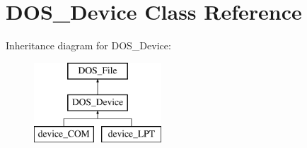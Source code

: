\hypertarget{classDOS__Device}{\section{D\-O\-S\-\_\-\-Device Class Reference}
\label{classDOS__Device}
}
Inheritance diagram for D\-O\-S\-\_\-\-Device\-:\begin{figure}[H]
\begin{center}
\leavevmode
\includegraphics[height=3.000000cm]{classDOS__Device}
\end{center}
\end{figure}
